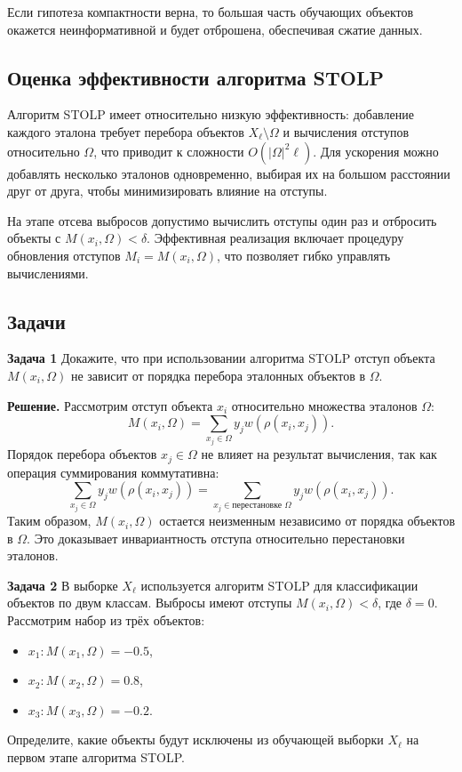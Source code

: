 Если гипотеза компактности верна, то большая часть обучающих объектов окажется неинформативной и будет отброшена, обеспечивая сжатие данных.

\subsection*{Оценка эффективности алгоритма STOLP}
Алгоритм STOLP имеет относительно низкую эффективность: добавление каждого эталона требует перебора объектов \( X_\ell \setminus \Omega \) и вычисления отступов относительно \( \Omega \), что приводит к сложности \( O(|\Omega|^2 \ell) \). Для ускорения можно добавлять несколько эталонов одновременно, выбирая их на большом расстоянии друг от друга, чтобы минимизировать влияние на отступы.

На этапе отсева выбросов допустимо вычислить отступы один раз и отбросить объекты с \( M(x_i, \Omega) < \delta \). Эффективная реализация включает процедуру обновления отступов \( M_i = M(x_i, \Omega) \), что позволяет гибко управлять вычислениями.

\subsection*{Задачи}

\textbf{Задача 1}
Докажите, что при использовании алгоритма STOLP отступ объекта \(M(x_i, \Omega)\) не зависит от порядка перебора эталонных объектов в \( \Omega \).

\textbf{Решение.}  
Рассмотрим отступ объекта \(x_i\) относительно множества эталонов \( \Omega \):
\[
M(x_i, \Omega) = \sum_{x_j \in \Omega} y_j w(\rho(x_i, x_j)).
\]
Порядок перебора объектов \(x_j \in \Omega\) не влияет на результат вычисления, так как операция суммирования коммутативна:
\[
\sum_{x_j \in \Omega} y_j w(\rho(x_i, x_j)) = \sum_{x_j \in \text{перестановке } \Omega} y_j w(\rho(x_i, x_j)).
\]
Таким образом, \(M(x_i, \Omega)\) остается неизменным независимо от порядка объектов в \( \Omega \). Это доказывает инвариантность отступа относительно перестановки эталонов.

\textbf{Задача 2}
В выборке \(X_\ell\) используется алгоритм STOLP для классификации объектов по двум классам. Выбросы имеют отступы \(M(x_i, \Omega) < \delta\), где \(\delta = 0\). Рассмотрим набор из трёх объектов:  
\begin{itemize}
    \item \(x_1: M(x_1, \Omega) = -0.5\),  
    \item \(x_2: M(x_2, \Omega) = 0.8\),  
    \item \(x_3: M(x_3, \Omega) = -0.2\).
\end{itemize}  
Определите, какие объекты будут исключены из обучающей выборки \(X_\ell\) на первом этапе алгоритма STOLP.

